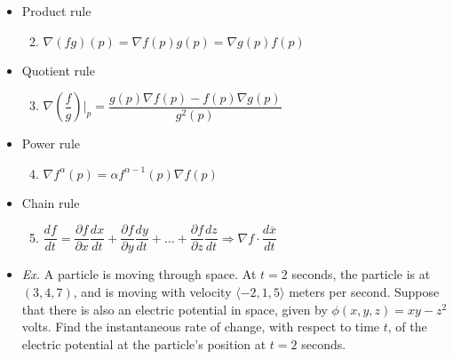 \begin{itemize}
  \item Product rule

    \begin{enumerate}

        \setcounter{enumi}{1}

      \item $\nabla (fg)(p)= \nabla f(p)g(p) = \nabla g(p) f(p)$

    \end{enumerate}

  \item Quotient rule

    \begin{enumerate}

        \setcounter{enumi}{2}

      \item $\nabla\left( \dfrac{f}{g} \right)\Big |_p=\dfrac{g(p)\nabla f(p) - f(p) \nabla g(p)}{g^2(p)}$

    \end{enumerate}

  \item Power rule

    \begin{enumerate}

        \setcounter{enumi}{3}

      \item $\nabla f^{\alpha}(p) = \alpha f^{\alpha - 1}(p) \nabla f(p)$

    \end{enumerate}

    \newpage

  \item Chain rule

    \begin{enumerate}

        \setcounter{enumi}{4}

      \item $\dfrac{df}{dt}=\dfrac{\partial f}{\partial x}\dfrac{dx}{dt} + \dfrac{\partial f}{\partial y}\dfrac{dy}{dt} + \dots + \dfrac{\partial f}{\partial z}\dfrac{dz}{dt}\Rightarrow \nabla f \cdot \dfrac{d\overline{x}}{dt}$

    \end{enumerate}

  \item \textit{Ex.} A particle is moving through space. At $t=2$ seconds, the particle is at $(3,4,7)$, and is moving with velocity $\langle -2, 1, 5 \rangle$ meters per second. Suppose that there is also an electric potential in space, given by $\phi(x,y,z)=xy-z^2$ volts. Find the instantaneous rate of change, with respect to time $t$, of the electric potential at the particle's position at $t=2$ seconds.


\end{itemize}
